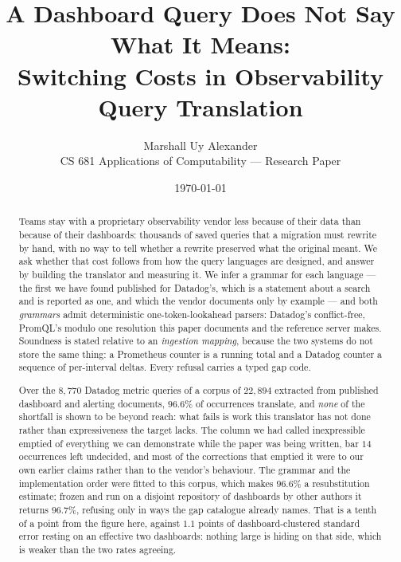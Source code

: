 \title{\textbf{A Dashboard Query Does Not Say What It Means:}\\
\Large Switching Costs in Observability Query Translation}
\author{Marshall Uy Alexander\\ \small CS 681 Applications of Computability --- Research Paper}
\date{\small \today}


\maketitle

\begin{abstract}\noindent
Teams stay with a proprietary observability vendor less because of their data than
because of their dashboards: thousands of saved queries that a migration must rewrite by
hand, with no way to tell whether a rewrite preserved what the original meant. We ask
whether that cost follows from how the query languages are designed, and answer by
building the translator and measuring it. We infer a grammar for each language --- the
first we have found published for Datadog's, which is a statement about a search and is
reported as one, and which the vendor documents only by example --- and both \emph{grammars}
admit deterministic one-token-lookahead parsers: Datadog's conflict-free, PromQL's modulo
one resolution this paper documents and the reference server makes. Soundness is stated relative to an \emph{ingestion mapping},
because the two systems do not store the same thing: a Prometheus counter is a running
total and a Datadog counter a sequence of per-interval deltas. Every refusal carries a
typed gap code.

Over the $8{,}770$ Datadog metric queries of a corpus of $22{,}894$ extracted from
published dashboard and alerting documents, $96.6\%$ of occurrences translate, and \emph{none} of the shortfall
is shown to be beyond reach: what fails is work this translator has not done rather than
expressiveness the target lacks. The column we had called inexpressible emptied of
everything we can demonstrate while the paper was being written, bar $14$ occurrences
left undecided, and most of the corrections that emptied it were to our own
earlier claims rather than to the vendor's behaviour. The grammar and the implementation
order were fitted to this corpus, which makes $96.6\%$ a resubstitution estimate; frozen
and run on a disjoint repository of dashboards by other authors it returns $96.7\%$,
refusing only in ways the gap catalogue already names. That is a tenth of a point from
the figure here, against $1.1$ points of dashboard-clustered standard error resting on
an effective two dashboards: nothing large is hiding on that side, which is weaker than
the two rates agreeing.


\end{abstract}
